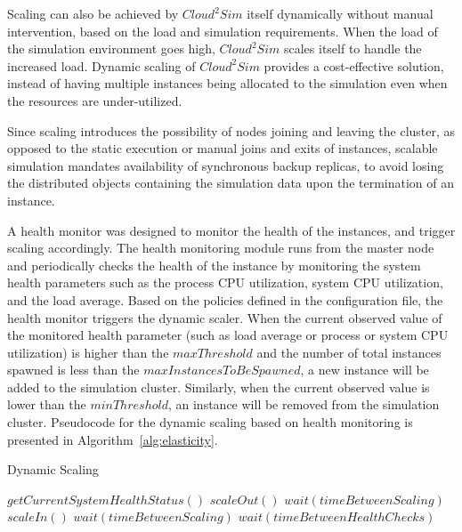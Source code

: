 Scaling can also be achieved by $Cloud^{2}Sim$ itself dynamically without manual intervention, based on the load and simulation requirements. When the load of the simulation environment goes high, $Cloud^{2}Sim$ scales itself to handle the increased load. Dynamic scaling of $Cloud^{2}Sim$ provides a cost-effective solution, instead of having multiple instances being allocated to the simulation even when the resources are under-utilized.

Since scaling introduces the possibility of nodes joining and leaving the cluster, as opposed to the static execution or manual joins and exits of instances, scalable simulation mandates availability of synchronous backup replicas, to avoid losing the distributed objects containing the simulation data upon the termination of an instance. 

A health monitor was designed to monitor the health of the instances, and trigger scaling accordingly. The health monitoring module runs from the master node and periodically checks the health of the instance by monitoring the system health parameters such as the process CPU utilization, system CPU utilization, and the load average. Based on the policies defined in the configuration file, the health monitor triggers the dynamic scaler. When the current observed value of the monitored health parameter (such as load average or process or system CPU utilization) is higher than the $maxThreshold$ and the number of total instances spawned is less than the $maxInstancesToBeSpawned$, a new instance will be added to the simulation cluster. Similarly, when the current observed value is lower than the $minThreshold$, an instance will be removed from the simulation cluster. Pseudocode for the dynamic scaling based on health monitoring is presented in Algorithm~\ref{alg:elasticity}.

\begin{algorithm}
  \caption{Dynamic Scaling}
\label{alg:elasticity}
  \begin{algorithmic}
\State $getCurrentSystemHealthStatus()$
    \State $scaleOut()$
    \State $wait(timeBetweenScaling)$
    \State $scaleIn()$
    \State $wait(timeBetweenScaling)$
\Else
    \State $wait(timeBetweenHealthChecks)$
\EndIf
    \EndWhile  
  \end{algorithmic}
\end{algorithm}


